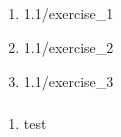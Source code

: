 \documentclass {article}
\renewcommand{\thesubsection}{}
\begin{document}
	\setcounter{section}{1}
	\renewcommand{\thesubsection}{Section \arabic{section}.\arabic{subsection}}
	\subsection{}
	\begin{enumerate}
		\item  {1.1/exercise_1}
		\item  {1.1/exercise_2}
		\item  {1.1/exercise_3}
	\end{enumerate}
	\renewcommand{\thesubsection}{}
	
	\setcounter{subsection}{2}
	\subsubsection{}
	\begin{enumerate}
		\item test
	\end{enumerate}
\end{document}
